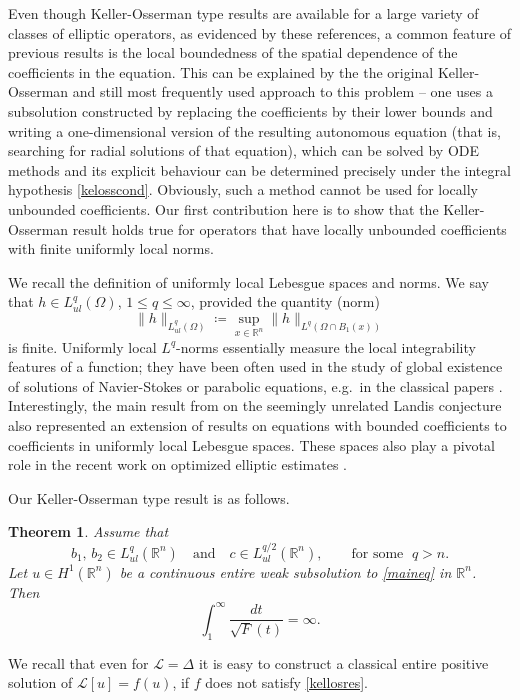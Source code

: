 \documentclass[12pt,a4paper]{amsart}
\numberwithin{equation}{section} %
\newtheorem{theorem}{Theorem}
\theoremstyle{definition}
\theoremstyle{remark}
\begin{document}
 Even though Keller-Osserman type results are available for a large variety of classes of elliptic operators, as evidenced by these references, a common feature of previous results is the local boundedness of the spatial dependence of the coefficients in the equation. This can be explained by the the original Keller-Osserman and still most frequently used approach to this problem -- one uses a subsolution constructed by replacing the coefficients by their lower bounds and writing a one-dimensional version of the resulting autonomous equation (that is, searching for radial solutions of that equation), which can be solved by ODE methods and its explicit behaviour can be determined precisely under the integral hypothesis \eqref{kelosscond}. Obviously, such a method cannot be used for locally unbounded coefficients. Our first contribution here is to show that the Keller-Osserman result holds true for operators that have locally unbounded coefficients with finite uniformly local norms.
 
We recall the definition of uniformly local Lebesgue spaces and norms. We say that $h\in L^q_{ul}(\Omega)$, $1\le q \le\infty$,  provided the quantity (norm)
\begin{equation}\label{deful}
\|h\|_{L^q_{ul}(\Omega)} \coloneqq \sup_{x\in \mathbb{R}^n} \|h\|_{L^q(\Omega\cap B_1(x))}
\end{equation}
is finite. Uniformly local $L^q$-norms essentially measure the local integrability features of a function; they  have been often used in the study of global existence of solutions of Navier-Stokes or parabolic equations, e.g.~in the classical papers \cite{GV, Ka}. Interestingly, the main result from \cite{SS21} on the seemingly unrelated Landis conjecture also represented an extension of results on equations with bounded coefficients to coefficients in uniformly local Lebesgue spaces. These spaces also play a pivotal role in the recent work on optimized elliptic estimates \cite{SS24}.

Our Keller-Osserman type result is as follows. 
\begin{theorem}\label{Keller-Osserman condition} Assume that \begin{equation}\label{coefs-loc-unif-integrable}
    b_1,\, b_2 \in L^q_{ul}(\mathbb{R}^n) 
    \quad \text{and} \quad 
    c \in L^{q/2}_{ul}(\mathbb{R}^n),\qquad\mbox{for some }\;q>n.
\end{equation}
Let $u \in H^1(\mathbb{R}^n)$ be a continuous entire weak subsolution to \eqref{maineq} in $\mathbb{R}^n$.
 Then
 \begin{equation}\label{kellosres}
    \int_{1}^\infty \frac{dt}{\sqrt{F}(t)} = \infty.
\end{equation}
\end{theorem}
 We recall that even for $\mathcal{L}=\Delta$ it is easy to construct a classical entire positive solution of $\mathcal{L}[u] = f(u)$, if $f$ does not satisfy \eqref{kellosres}.
 \medskip 
\end{document}
